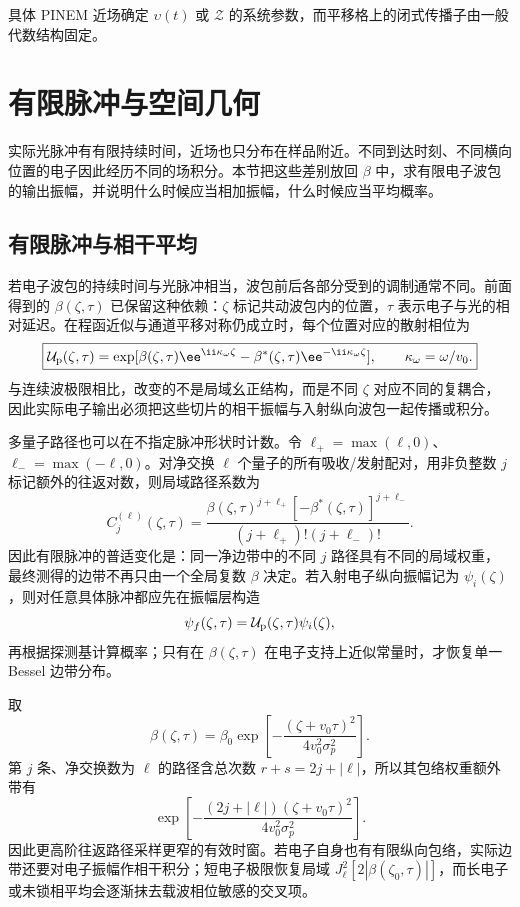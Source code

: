 具体 PINEM 近场确定 $\upsilon(t)$ 或 $\mathcal Z$ 的系统参数，而平移格上的闭式传播子由一般代数结构固定。



\section{有限脉冲与空间几何}

实际光脉冲有有限持续时间，近场也只分布在样品附近。不同到达时刻、不同横向位置的电子因此经历不同的场积分。本节把这些差别放回 $\beta$ 中，求有限电子波包的输出振幅，并说明什么时候应当相加振幅，什么时候应当平均概率。

\subsection{有限脉冲与相干平均}

若电子波包的持续时间与光脉冲相当，波包前后各部分受到的调制通常不同。前面得到的 $\beta(\zeta,\tau)$ 已保留这种依赖：$\zeta$ 标记共动波包内的位置，$\tau$ 表示电子与光的相对延迟。在程函近似与通道平移对称仍成立时，每个位置对应的散射相位为
\begin{equation}
\boxed{
\mathcal U_{\rm p}(\zeta,\tau)
=\exp[\beta(\zeta,\tau)\ee^{\ii\kappa_\omega\zeta}
-\beta^*(\zeta,\tau)\ee^{-\ii\kappa_\omega\zeta}],
\qquad \kappa_\omega=\omega/v_0.}
\label{eq:pinem_finite_pulse_local_phase}
\end{equation}
与连续波极限相比，改变的不是局域幺正结构，而是不同 $\zeta$ 对应不同的复耦合，因此实际电子输出必须把这些切片的相干振幅与入射纵向波包一起传播或积分。

多量子路径也可以在不指定脉冲形状时计数。令 $\ell_+=\max(\ell,0)$、$\ell_-=\max(-\ell,0)$。对净交换 $\ell$ 个量子的所有吸收/发射配对，用非负整数 $j$ 标记额外的往返对数，则局域路径系数为
\begin{equation}
\boxed{
C_j^{(\ell)}(\zeta,\tau)
=\frac{\beta(\zeta,\tau)^{j+\ell_+}
[-\beta^*(\zeta,\tau)]^{j+\ell_-}}
{(j+\ell_+)!(j+\ell_-)!}.}
\label{eq:park_Cjn_general}
\end{equation}
因此有限脉冲的普适变化是：同一净边带中的不同 $j$ 路径具有不同的局域权重，最终测得的边带不再只由一个全局复数 $\beta$ 决定。若入射电子纵向振幅记为 $\psi_i(\zeta)$，则对任意具体脉冲都应先在振幅层构造
\[
\psi_f(\zeta,\tau)
=\mathcal U_{\rm p}(\zeta,\tau)\psi_i(\zeta),
\]
再根据探测基计算概率；只有在 $\beta(\zeta,\tau)$ 在电子支持上近似常量时，才恢复单一 Bessel 边带分布。

\begin{exbox}[高斯光脉冲]
取
\[
\beta(\zeta,\tau)=\beta_0
\exp\!\left[-\frac{(\zeta+v_0\tau)^2}{4v_0^2\sigma_p^2}\right].
\]
第 $j$ 条、净交换数为 $\ell$ 的路径含总次数
$r+s=2j+|\ell|$，所以其包络权重额外带有
\[
\exp\!\left[-\frac{(2j+|\ell|)(\zeta+v_0\tau)^2}
{4v_0^2\sigma_p^2}\right].
\]
因此更高阶往返路径采样更窄的有效时窗。若电子自身也有有限纵向包络，实际边带还要对电子振幅作相干积分；短电子极限恢复局域 $J_\ell^2[2|\beta(\zeta_0,\tau)|]$，而长电子或未锁相平均会逐渐抹去载波相位敏感的交叉项。
\end{exbox}


